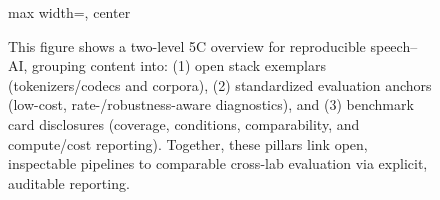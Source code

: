 \begin{figure}[h]
\begin{adjustbox}{max width=\textwidth, center}
\begin{tikzpicture}
\end{tikzpicture}
\end{adjustbox}

\caption{This figure shows a two-level 5C overview for reproducible speech–AI, grouping content into: (1) open stack exemplars (tokenizers/codecs and corpora), (2) standardized evaluation anchors (low-cost, rate-/robustness-aware diagnostics), and (3) benchmark card disclosures (coverage, conditions, comparability, and compute/cost reporting). Together, these pillars link open, inspectable pipelines to comparable cross-lab evaluation via explicit, auditable reporting.}
\label{fig:tiny_tree_figure_12}

\end{figure}
